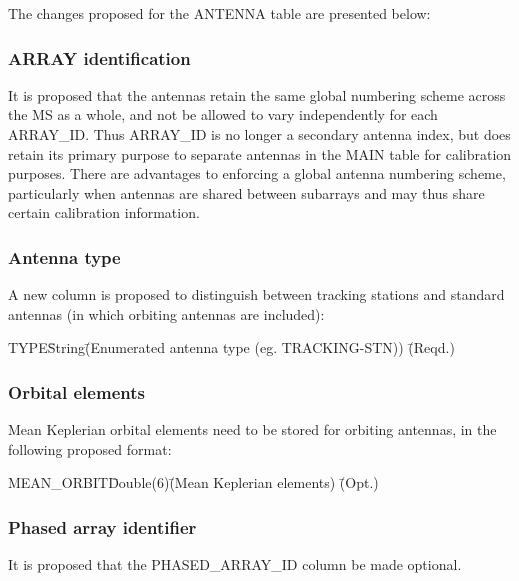 \documentclass{article}
\begin{document}
The changes proposed for the ANTENNA table are presented below:

\subsubsection{ARRAY identification}

It is proposed that the antennas retain the same global numbering
scheme across the MS as a whole, and not be allowed to vary
independently for each ARRAY\_ID. Thus ARRAY\_ID is no longer a
secondary antenna index, but does retain its primary purpose to separate
antennas in the MAIN table for calibration purposes. There are
advantages to enforcing a global antenna numbering scheme,
particularly when antennas are shared between subarrays and may thus
share certain calibration information.

\subsubsection{Antenna type}

A new column is proposed to distinguish between tracking stations and
standard antennas (in which orbiting antennas are included):

\begin{tabbing}
TYPE\quad\quad \= String\quad\quad \= 
(Enumerated antenna type (eg. TRACKING-STN))
 \quad\quad \= (Reqd.) \\
\end{tabbing}

\subsubsection{Orbital elements}

Mean Keplerian orbital elements need to be stored for orbiting
antennas, in the following proposed format:

\begin{tabbing}
MEAN\_ORBIT\quad\quad \= Double(6)\quad\quad \= (Mean Keplerian elements)
 \quad\quad \= (Opt.) \\
\end{tabbing}

\subsubsection{Phased array identifier}

It is proposed that the PHASED\_ARRAY\_ID column be made optional.
\end{document}
